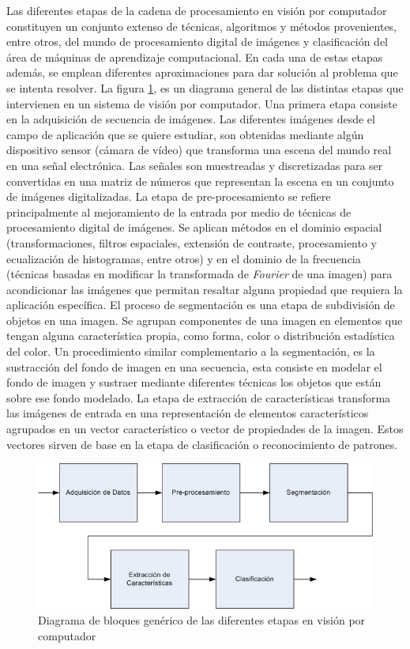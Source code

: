 \indent Las diferentes etapas de la cadena de procesamiento en visión por computador constituyen un conjunto extenso de técnicas, algoritmos y métodos provenientes, entre otros, del mundo de procesamiento digital de imágenes y clasificación del área de máquinas de aprendizaje computacional. En cada una de estas etapas además, se emplean diferentes aproximaciones para dar solución al problema que se intenta resolver. La figura \ref{fig:etapas_vision_computador}, es un diagrama general de las distintas etapas que intervienen en un sistema de visión por computador. Una primera etapa consiste en la adquisición de secuencia de imágenes. Las diferentes imágenes desde el campo de aplicación que se quiere estudiar, son obtenidas mediante algún dispositivo sensor (cámara de vídeo) que transforma una escena del mundo real en una señal electrónica. Las señales son muestreadas y discretizadas para ser convertidas en una matriz de números que representan la escena en un conjunto de imágenes digitalizadas. La etapa de pre-procesamiento se refiere principalmente al mejoramiento de la entrada por medio de técnicas de procesamiento digital de imágenes. Se aplican métodos en el dominio espacial (transformaciones, filtros espaciales, extensión de contraste, procesamiento y ecualización de histogramas, entre otros) y en el dominio de la frecuencia (técnicas basadas en modificar la transformada de \textit{Fourier} de una imagen) para acondicionar las imágenes que permitan resaltar alguna propiedad que requiera la aplicación específica. El proceso de segmentación es una etapa de subdivisión de objetos en una imagen. Se agrupan componentes de una imagen en elementos que tengan alguna característica propia, como forma, color o distribución estadística del color. Un procedimiento similar complementario a la segmentación, es la sustracción del fondo de imagen en una secuencia, esta consiste en modelar el fondo de imagen y sustraer mediante diferentes técnicas los objetos que están sobre ese fondo modelado. La etapa de extracción de características transforma las imágenes de entrada en una representación de elementos característicos agrupados en un vector característico o vector de propiedades de la imagen. Estos vectores sirven de base en la etapa de clasificación o reconocimiento de patrones. 



\begin{figure}[h!]
  \centering
      \includegraphics[scale=0.5]{img/generic_block_diagram_computer_vision}
  \caption[Diagrama de bloques etapas visión por computador]{Diagrama de bloques genérico de las diferentes etapas en visión por computador}
\label{fig:etapas_vision_computador}
\end{figure}

